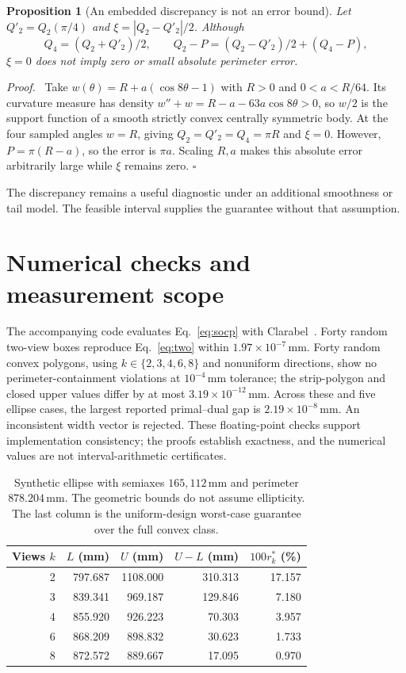 \documentclass[11pt,a4paper]{article}
\newtheorem{proposition}[theorem]{Proposition}
\newenvironment{proof}{\par\noindent\textit{Proof.}\ }{\hfill$\square$\par\medskip}
\begin{document}
\begin{proposition}[An embedded discrepancy is not an error bound]
Let $Q'_2=Q_2(\pi/4)$ and $\xi=|Q_2-Q'_2|/2$. Although
\begin{equation}
Q_4=(Q_2+Q'_2)/2,\qquad Q_2-P=(Q_2-Q'_2)/2+(Q_4-P),
\end{equation}
$\xi=0$ does not imply zero or small absolute perimeter error.
\end{proposition}
\begin{proof}
Take $w(\theta)=R+a(\cos8\theta-1)$ with $R>0$ and $0<a<R/64$. Its curvature measure has density $w''+w=R-a-63a\cos8\theta>0$, so $w/2$ is the support function of a smooth strictly convex centrally symmetric body. At the four sampled angles $w=R$, giving $Q_2=Q'_2=Q_4=\pi R$ and $\xi=0$. However, $P=\pi(R-a)$, so the error is $\pi a$. Scaling $R,a$ makes this absolute error arbitrarily large while $\xi$ remains zero.
\end{proof}
The discrepancy remains a useful diagnostic under an additional smoothness or tail model. The feasible interval supplies the guarantee without that assumption.

\section{Numerical checks and measurement scope}
The accompanying code evaluates Eq.~\eqref{eq:socp} with Clarabel~\cite{clarabel}. Forty random two-view boxes reproduce Eq.~\eqref{eq:two} within $1.97\times10^{-7}$\,mm. Forty random convex polygons, using $k\in\{2,3,4,6,8\}$ and nonuniform directions, show no perimeter-containment violations at $10^{-4}$\,mm tolerance; the strip-polygon and closed upper values differ by at most $3.19\times10^{-12}$\,mm. Across these and five ellipse cases, the largest reported primal--dual gap is $2.19\times10^{-8}$\,mm. An inconsistent width vector is rejected. These floating-point checks support implementation consistency; the proofs establish exactness, and the numerical values are not interval-arithmetic certificates.

\begin{table}[htbp]
\centering\small
\caption{Synthetic ellipse with semiaxes $165,112$\,mm and perimeter $878.204$\,mm. The geometric bounds do not assume ellipticity. The last column is the uniform-design worst-case guarantee over the full convex class.}
\begin{tabular}{rrrrr}
\toprule
Views $k$ & $L$ (mm) & $U$ (mm) & $U-L$ (mm) & $100r_k^*$ (\%)\\
\midrule
2 & 797.687 & 1108.000 & 310.313 & 17.157\\
3 & 839.341 & 969.187 & 129.846 & 7.180\\
4 & 855.920 & 926.223 & 70.303 & 3.957\\
6 & 868.209 & 898.832 & 30.623 & 1.733\\
8 & 872.572 & 889.667 & 17.095 & 0.970\\
\bottomrule
\end{tabular}
\end{table}
\end{document}
